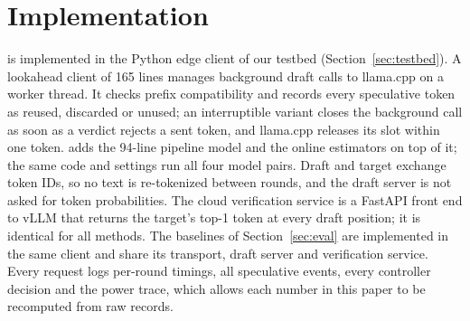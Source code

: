 \section{Implementation}
\label{sec:impl}
\cape{} is implemented in the Python edge client of our testbed (Section~\ref{sec:testbed}). A lookahead client of 165 lines manages background draft calls to llama.cpp on a worker thread. It checks prefix compatibility and records every speculative token as reused, discarded or unused; an interruptible variant closes the background call as soon as a verdict rejects a sent token, and llama.cpp releases its slot within one token. \cape{} adds the 94-line pipeline model and the online estimators on top of it; the same code and settings run all four model pairs. Draft and target exchange token IDs, so no text is re-tokenized between rounds, and the draft server is not asked for token probabilities. The cloud verification service is a FastAPI front end to vLLM that returns the target's top-1 token at every draft position; it is identical for all methods. The baselines of Section~\ref{sec:eval} are implemented in the same client and share its transport, draft server and verification service. Every request logs per-round timings, all speculative events, every controller decision and the power trace, which allows each number in this paper to be recomputed from raw records.
